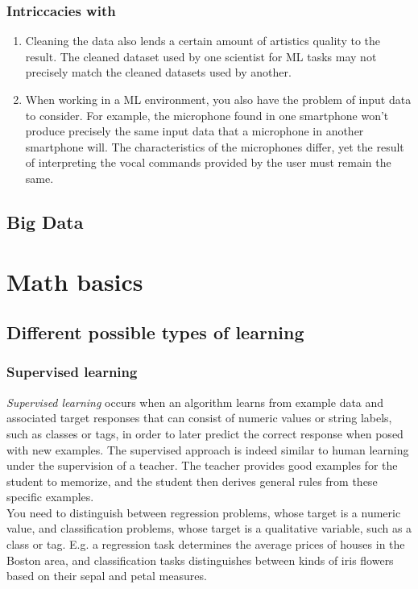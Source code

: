 \subsubsection{Intriccacies with}
\begin{enumerate}
	\item Cleaning the data also lends a certain amount of artistics quality to the result. The cleaned dataset used by one scientist for ML tasks may not precisely match the cleaned datasets used by another.
	\item When working in a ML environment, you also have the problem of input data to consider. For example, the microphone found in one smartphone won't produce precisely the same input data that a microphone in another smartphone will. The characteristics of the microphones differ, yet the result of interpreting the vocal commands provided by the user must remain the same.
\end{enumerate}

\subsection{Big Data}
\section{Math basics}
\subsection{Different possible types of learning}
\subsubsection{Supervised learning}
\emph{Supervised learning} occurs when an algorithm learns from example data and associated target responses that can consist of numeric values or string labels, such as classes or tags, in order to later predict the correct response when posed with new examples. The supervised approach is indeed similar to human learning under the supervision of a teacher. The teacher provides good examples for the student to memorize, and the student then derives general rules from these specific examples.\\
You need to distinguish between regression problems, whose target is a numeric value, and classification problems, whose target is a qualitative variable, such as a class or tag. E.g. a regression task determines the average prices of houses in the Boston area, and classification tasks distinguishes between kinds of iris flowers based on their sepal and petal measures. 
